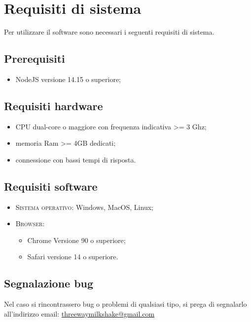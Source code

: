 \section{Requisiti di sistema}
Per utilizzare il software sono necessari i seguenti requisiti di sistema.
\subsection{Prerequisiti}
    \begin{itemize}
        \item NodeJS versione 14.15 o superiore;
    \end{itemize}
\subsection{Requisiti hardware}
\begin{itemize}
	\item CPU dual-core o maggiore con frequenza indicativa >= 3 Ghz;
	\item memoria Ram >= 4GB dedicati;
	\item connessione con bassi tempi di risposta.
\end{itemize}
\subsection{Requisiti software}
\begin{itemize}
    \item \textsc{Sistema operativo}: Windows, MacOS, Linux;
    \item \textsc{Browser}: 
    \begin{itemize}
        \item Chrome Versione 90 o superiore;
        \item Safari versione 14 o superiore.
    \end{itemize}
\end{itemize}

\subsection{Segnalazione bug}
Nel caso si rincontrassero bug o problemi di qualsiasi tipo, si prega di segnalarlo all'indirizzo email: \href{mailto:threewaymilkshake@gmail.com}{threewaymilkshake@gmail.com}